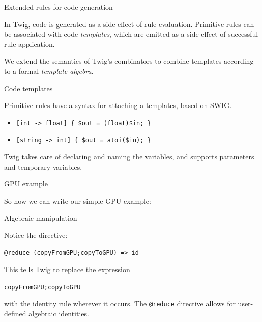 \documentclass{beamer}
\begin{document}
\begin{frame}{Extended rules for code generation}

In Twig, code is generated as a side effect of rule evaluation. Primitive
rules can be associated with code \emph{templates}, which are emitted as a
side effect of successful rule application.

We extend the semantics of Twig's combinators to combine templates according
to a formal \emph{template algebra}.

\end{frame}


\begin{frame}{Code templates}

Primitive rules have a syntax for attaching a templates, based on SWIG.

\begin{itemize}
  \item \texttt{[int -> float] \{ \$out = (float)\$in; \}}
  \item \texttt{[string -> int] \{ \$out = atoi(\$in); \}}
\end{itemize}  

Twig takes care of declaring and naming the variables, and supports parameters
and temporary variables.

\end{frame}


\begin{frame}[fragile]{GPU example}

So now we can write our simple GPU example:

\small

\normalsize

\end{frame}


\begin{frame}[fragile]{Algebraic manipulation}

Notice the \texttt{\@reduce} directive:

\begin{verbatim}
@reduce (copyFromGPU;copyToGPU) => id
\end{verbatim}

This tells Twig to replace the expression

\texttt{copyFromGPU;copyToGPU}

with the identity rule wherever it occurs. The \texttt{@reduce} directive
allows for user-defined algebraic identities.

\end{frame}
\end{document}
